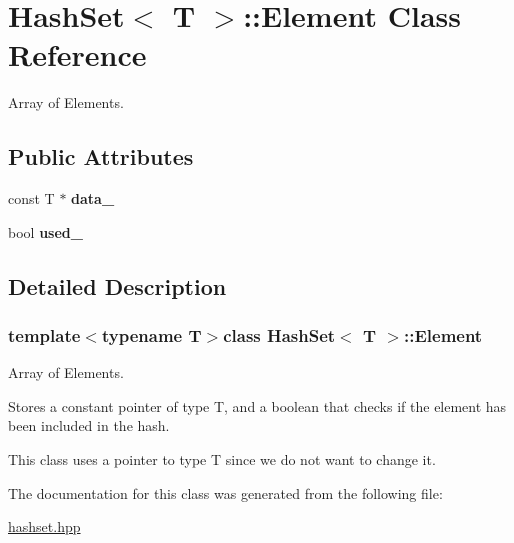 \hypertarget{class_hash_set_1_1_element}{\section{Hash\-Set$<$ T $>$\-:\-:Element Class Reference}
\label{class_hash_set_1_1_element}
}


Array of Elements.  


\subsection*{Public Attributes}
\begin{DoxyCompactItemize}
\item 
\hypertarget{class_hash_set_1_1_element_a6245ad05cf796ac9330c8eea0d50aa2a}{const T $\ast$ {\bfseries data\-\_\-}}\label{class_hash_set_1_1_element_a6245ad05cf796ac9330c8eea0d50aa2a}

\item 
\hypertarget{class_hash_set_1_1_element_ad54392827ded611f0734b6346f3da14f}{bool {\bfseries used\-\_\-}}\label{class_hash_set_1_1_element_ad54392827ded611f0734b6346f3da14f}

\end{DoxyCompactItemize}


\subsection{Detailed Description}
\subsubsection*{template$<$typename T$>$class Hash\-Set$<$ T $>$\-::\-Element}

Array of Elements. 

Stores a constant pointer of type T, and a boolean that checks if the element has been included in the hash.

This class uses a pointer to type T since we do not want to change it. 

The documentation for this class was generated from the following file\-:\begin{DoxyCompactItemize}
\item 
\hyperlink{hashset_8hpp}{hashset.\-hpp}\end{DoxyCompactItemize}
